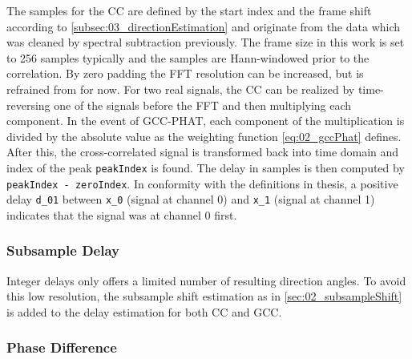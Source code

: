 The samples for the \ac{CC} are defined by the start index and the frame shift
according to \cref{subsec:03_directionEstimation} and originate from the data which was
cleaned by spectral subtraction previously.
The frame size in this work is set to 256 samples typically and the samples are Hann-windowed
prior to the correlation.
By zero padding the \ac{FFT} resolution can be increased, but is refrained from for now.
For two real signals, the \ac{CC} can be realized by time-reversing one of the signals before
the \ac{FFT} and then multiplying each component.
In the event of \ac{GCC-PHAT}, each component of the multiplication is divided by the absolute
value as the weighting function \cref{eq:02_gccPhat} defines.
After this, the cross-correlated signal is transformed back into time domain and
index of the peak \lstinline!peakIndex! is found.
The delay in samples is then computed by \lstinline!peakIndex - zeroIndex!.
In conformity with the definitions in thesis, a positive delay \lstinline!d_01!
between \lstinline!x_0! (signal at channel 0) and \lstinline!x_1! (signal at channel 1)
indicates that the signal was at channel 0 first.

\subsubsection*{Subsample Delay}
\label{subsubsec:03_subsample}

Integer delays only offers a limited number of resulting direction angles.
To avoid this low resolution, the subsample shift estimation as in \cref{sec:02_subsampleShift}
is added to the delay estimation for both \ac{CC} and \ac{GCC}.

\subsubsection{Phase Difference}
\label{subsubsec:03_phase}


